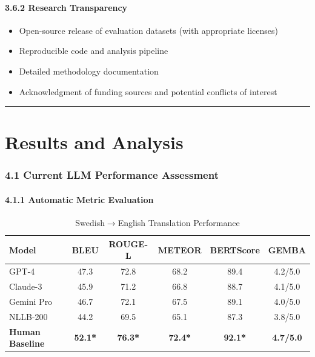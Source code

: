 \documentclass[12pt,a4paper]{article}
\providecommand{\tightlist}{%
  \setlength{\itemsep}{0pt}\setlength{\parskip}{0pt}}
\begin{document}
{{\hypertarget{research-transparency}{%
\paragraph{3.6.2 Research Transparency}\label{research-transparency}}

\begin{itemize}
\tightlist
\item
  Open-source release of evaluation datasets (with appropriate licenses)
\item
  Reproducible code and analysis pipeline
\item
  Detailed methodology documentation
\item
  Acknowledgment of funding sources and potential conflicts of interest
\end{itemize}

\begin{center}\rule{0.5\linewidth}{0.5pt}\end{center}

\hypertarget{results-and-analysis}{%
\section{Results and Analysis}

\hypertarget{current-llm-performance-assessment}{%
\subsubsection{4.1 Current LLM Performance
Assessment}\label{current-llm-performance-assessment}}

\hypertarget{automatic-metric-evaluation}{%
\paragraph{4.1.1 Automatic Metric
Evaluation}\label{automatic-metric-evaluation}}

\begin{table}[htbp]
\centering
\caption{Swedish$\rightarrow$English Translation Performance}
\begin{tabular}{|l|c|c|c|c|c|}
\hline
\textbf{Model} & \textbf{BLEU} & \textbf{ROUGE-L} & \textbf{METEOR} & \textbf{BERTScore} & \textbf{GEMBA} \\
\hline
GPT-4 & 47.3 & 72.8 & 68.2 & 89.4 & 4.2/5.0 \\
Claude-3 & 45.9 & 71.2 & 66.8 & 88.7 & 4.1/5.0 \\
Gemini Pro & 46.7 & 72.1 & 67.5 & 89.1 & 4.0/5.0 \\
NLLB-200 & 44.2 & 69.5 & 65.1 & 87.3 & 3.8/5.0 \\
\hline
\textbf{Human Baseline} & \textbf{52.1*} & \textbf{76.3*} & \textbf{72.4*} & \textbf{92.1*} & \textbf{4.7/5.0} \\
\hline
\end{tabular}
\label{tab:swedish-english}
\end{table}

}}}
\end{document}

